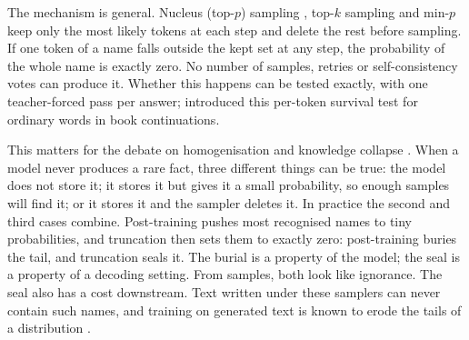 \documentclass[11pt]{article}
\begin{document}


The mechanism is general. Nucleus (top-$p$) sampling \citep{holtzman2020curious}, top-$k$ sampling \citep{fan2018hierarchical} and min-$p$ \citep{nguyen2025minp} keep only the most likely tokens at each step and delete the rest before sampling. If one token of a name falls outside the kept set at any step, the probability of the whole name is exactly zero. No number of samples, retries or self-consistency votes can produce it. Whether this happens can be tested exactly, with one teacher-forced pass per answer; \citet{awad2026lost} introduced this per-token survival test for ordinary words in book continuations.

This matters for the debate on homogenisation and knowledge collapse \citep{peterson2025collapse,wright2026epistemic}. When a model never produces a rare fact, three different things can be true: the model does not store it; it stores it but gives it a small probability, so enough samples will find it; or it stores it and the sampler deletes it. In practice the second and third cases combine. Post-training pushes most recognised names to tiny probabilities, and truncation then sets them to exactly zero: post-training buries the tail, and truncation seals it. The burial is a property of the model; the seal is a property of a decoding setting. From samples, both look like ignorance. The seal also has a cost downstream. Text written under these samplers can never contain such names, and training on generated text is known to erode the tails of a distribution \citep{shumailov2024collapse,guo2024curious}.
\end{document}
